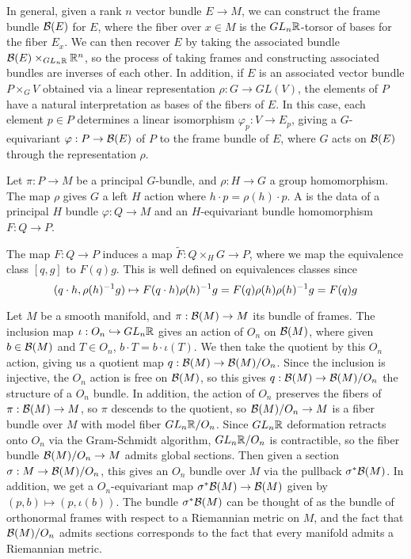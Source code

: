 In general, given a rank $n$ vector bundle $E \to M$, we can construct the
frame bundle  $\mathcal{B}(E)$ for $E$, where the fiber over $x \in M$ is the
$GL_n\mathbb{R}$-torsor of bases for the fiber $E_x$. We can then
recover $E$ by taking the associated bundle $\mathcal{B}(E) \times_{GL_n\mathbb{R}} \mathbb{R}^n$,
so the process of taking frames and constructing associated bundles are inverses
of each other. In addition, if $E$ is an associated vector bundle
$P \times_G V$ obtained via a linear representation $\rho : G \to GL(V)$, the
elements of $P$ have a natural interpretation as bases of the fibers of $E$.
In this case, each element $p \in P$ determines a linear isomorphism
$\varphi_p : V \to E_p$, giving a $G$-equivariant $\varphi : P \to \mathcal{B}(E)$ of
$P$ to the frame bundle of $E$, where $G$ acts on $\mathcal{B}(E)$ through the
representation $\rho$.
%
\begin{defn}
 Let $\pi : P \to M$ be a principal $G$-bundle, and $\rho : H \to G$ a group
 homomorphism. The map $\rho$ gives $G$ a left $H$ action where
 $h \cdot p = \rho(h) \cdot p$. A  is the
 data of a principal $H$ bundle $\varphi : Q \to M$ and an $H$-equivariant bundle
 homomorphism $F : Q \to P$.
\end{defn}
%
The map $F : Q \to P$ induces a map $\tilde{F} : Q \times_H G \to P$, where we
map the equivalence class $[q,g]$ to $F(q) g$. This is well defined
on equivalences classes since
\[
 (q \cdot h, \rho(h)^{-1} g) \mapsto F(q \cdot h)\rho(h)^{-1} g = F(q)\rho(h)\rho(h)^{-1} g
 = F(q)g
\]
%
\begin{exmp}
 Let $M$ be a smooth manifold, and $\pi : \mathcal{B}(M) \to M$ its bundle of frames.
 The inclusion map $\iota: O_n \hookrightarrow GL_n\mathbb{R}$ gives an action of $O_n$ on
 $\mathcal{B}(M)$, where given $b \in \mathcal{B}(M)$ and $T \in O_n$, $b \cdot T = b \cdot \iota(T)$.
 We then take the quotient by this $O_n$ action, giving us a quotient map
 $q : \mathcal{B}(M) \to \mathcal{B}(M) / O_n$. Since the inclusion is injective, the $O_n$ action
 is free on $\mathcal{B}(M)$, so this gives $q : \mathcal{B}(M) \to \mathcal{B}(M) / O_n$ the structure of a
 $O_n$ bundle. In addition, the action of $O_n$ preserves the fibers of
 $\pi : \mathcal{B}(M) \to M$, so $\pi$ descends to the quotient, so $\mathcal{B}(M) / O_n \to M$
 is a fiber bundle over $M$ with model fiber $GL_n\mathbb{R} / O_n$. Since $GL_n\mathbb{R}$ deformation
 retracts onto $O_n$ via the Gram-Schmidt algorithm, $GL_n\mathbb{R} / O_n$ is
 contractible, so the fiber bundle $\mathcal{B}(M)/ O_n \to M$ admits global sections.
 Then given a section $\sigma : M \to \mathcal{B}(M) / O_n$, this gives an $O_n$ bundle
 over $M$ via the pullback $\sigma^*\mathcal{B}(M)$. In addition, we get a $O_n$-equivariant
 map $\sigma^*\mathcal{B}(M) \to \mathcal{B}(M)$ given by $(p, b) \mapsto (p, \iota(b))$. The
 bundle $\sigma^*\mathcal{B}(M)$ can be thought of as the bundle of orthonormal frames
 with respect to a Riemannian metric on $M$, and the fact that $\mathcal{B}(M) / O_n$
 admits sections corresponds to the fact that every manifold admits a Riemannian
 metric.
\end{exmp}
